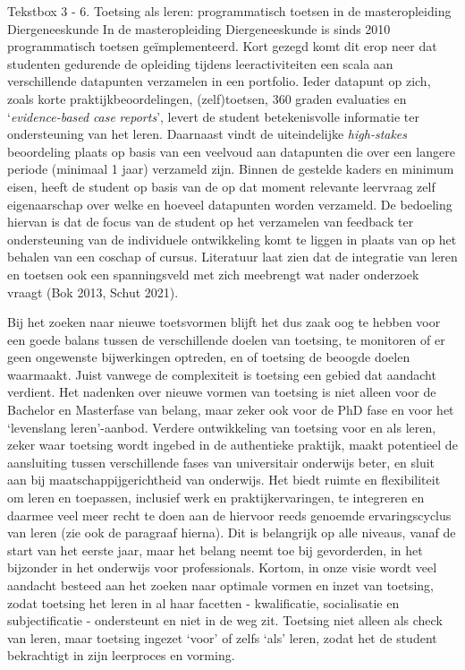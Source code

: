 \documentclass[smallauthor, chapterhaspagenum, nochapterinheader, pagenuminheader,  bigchapnum,medium2, tocpages,  garamond, titleinheader]{jote-book}
\begin{document}
	\begin{bookbox}{Tekstbox 3 - 6. Toetsing als leren: programmatisch toetsen in de masteropleiding Diergeneeskunde}
		In de masteropleiding Diergeneeskunde is sinds 2010 programmatisch toetsen geïmplementeerd. Kort gezegd komt dit erop neer dat studenten gedurende de opleiding tijdens leeractiviteiten een scala aan verschillende datapunten verzamelen in een portfolio. Ieder datapunt op zich, zoals korte praktijkbeoordelingen, (zelf)toetsen, 360 graden evaluaties en ‘\emph{evidence-based}\emph{ case }\emph{reports}', levert de student betekenisvolle informatie ter ondersteuning van het leren. Daarnaast vindt de uiteindelijke \emph{high-}\emph{stakes} beoordeling plaats op basis van een veelvoud aan datapunten die over een langere periode (minimaal 1 jaar) verzameld zijn. Binnen de gestelde kaders en minimum eisen, heeft de student op basis van de op dat moment relevante leervraag zelf eigenaarschap over welke en hoeveel datapunten worden verzameld. De bedoeling hiervan is dat de focus van de student op het verzamelen van feedback ter ondersteuning van de individuele ontwikkeling komt te liggen in plaats van op het behalen van een coschap of cursus. Literatuur laat zien dat de integratie van leren en toetsen ook een spanningsveld met zich meebrengt wat nader onderzoek vraagt (Bok 2013, Schut 2021).\emph{ }
	\end{bookbox}

	Bij het zoeken naar nieuwe toetsvormen blijft het dus zaak oog te hebben voor een goede balans tussen de verschillende doelen van toetsing, te monitoren of er geen ongewenste bijwerkingen optreden, en of toetsing de beoogde doelen waarmaakt. Juist vanwege de complexiteit is toetsing een gebied dat aandacht verdient. Het nadenken over nieuwe vormen van toetsing is niet alleen voor de Bachelor en Masterfase van belang, maar zeker ook voor de PhD fase en voor het ‘levenslang leren'-aanbod. Verdere ontwikkeling van toetsing voor en als leren, zeker waar toetsing wordt ingebed in de authentieke praktijk, maakt potentieel de aansluiting tussen verschillende fases van universitair onderwijs beter, en sluit aan bij maatschappijgerichtheid van onderwijs. Het biedt ruimte en flexibiliteit om leren en toepassen, inclusief werk en praktijkervaringen, te integreren en daarmee veel meer recht te doen aan de hiervoor reeds genoemde ervaringscyclus van leren (zie ook de paragraaf hierna). Dit is belangrijk op alle niveaus, vanaf de start van het eerste jaar, maar het belang neemt toe bij gevorderden, in het bijzonder in het onderwijs voor professionals. Kortom, in onze visie wordt veel aandacht besteed aan het zoeken naar optimale vormen en inzet van toetsing, zodat toetsing het leren in al haar facetten - kwalificatie, socialisatie en subjectificatie - ondersteunt en niet in de weg zit. Toetsing niet alleen als check van leren, maar toetsing ingezet ‘voor' of zelfs ‘als' leren, zodat het de student bekrachtigt in zijn leerproces en vorming.
\end{document}
